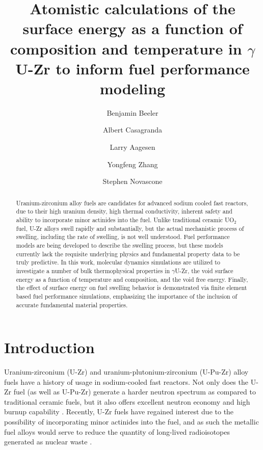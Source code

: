 \documentclass[review]{elsarticle}
\begin{document}
\begin{frontmatter}
\title{Atomistic calculations of the surface energy as a function of composition and temperature in $\gamma$ U-Zr to inform fuel performance modeling}


\author[inl,ncsu]{Benjamin Beeler}
\author[inl]{Albert Casagranda}
\author[inl]{Larry Aagesen}
\author[inl]{Yongfeng Zhang}
\author[inl]{Stephen Novascone}
\address[inl]{Idaho National Laboratory, Idaho Falls, ID 83415}
\address[ncsu]{North Carolina State University, Raleigh, NC 27607}


\begin{abstract}

Uranium-zirconium alloy fuels are candidates for advanced sodium cooled fast reactors, due to their high uranium density, high thermal conductivity, inherent safety and ability to incorporate minor actinides into the fuel. Unlike traditional ceramic UO$_2$ fuel, U-Zr alloys swell rapidly and substantially, but the actual mechanistic process of swelling, including the rate of swelling, is not well understood. Fuel performance models are being developed to describe the swelling process, but these models currently lack the requisite underlying physics and fundamental property data to be truly predictive. In this work, molecular dynamics simulations are utilized to investigate a number of bulk thermophysical properties in  $\gamma$U-Zr, the void surface energy as a function of temperature and composition, and the void free energy. Finally, the effect of surface energy on fuel swelling behavior is demonstrated via finite element based fuel performance simulations, emphasizing the importance of the inclusion of accurate fundamental material properties. 


\end{abstract}
\end{frontmatter}

\linenumbers
\modulolinenumbers[5]

\section{Introduction}

Uranium-zirconium (U-Zr) and uranium-plutonium-zirconium (U-Pu-Zr) alloy fuels have a history of usage in sodium-cooled fast reactors. Not only does the U-Zr fuel (as well as U-Pu-Zr) generate a harder neutron spectrum as compared to traditional ceramic fuels, but it also offers excellent neutron economy and high burnup capability \cite{hofman1997}. Recently, U-Zr fuels have regained interest due to the possibility of incorporating minor actinides into the fuel, and as such the metallic fuel alloys would serve to reduce the quantity of long-lived radioisotopes generated as nuclear waste \cite{capriotti2017}. 
\end{document}
